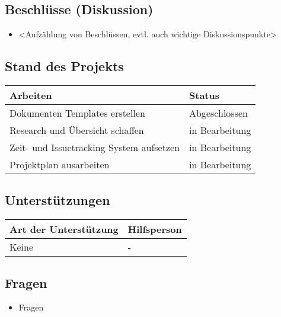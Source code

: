\vspace{1cm}

\subsection*{Beschlüsse (Diskussion)}
\begin{itemize}
    \item <Aufzählung von Beschlüssen, evtl. auch wichtige Diskussionspunkte>
\end{itemize}


\clearpage


\subsection*{Stand des Projekts}
\begin{table}[H]
    \centering
    \begin{tabular}{p{12cm} p{4cm}}
        \textbf{Arbeiten} & \textbf{Status} \\ \hline
        Dokumenten Templates erstellen & Abgeschlossen \\ \hline
        Research und Übersicht schaffen & in Bearbeitung \\ \hline
        Zeit- und Issuetracking System aufsetzen & in Bearbeitung \\ \hline
        Projektplan ausarbeiten & in Bearbeitung \\ \hline
    \end{tabular}
\end{table}

\vspace{1cm}

\subsection*{Unterstützungen}
\begin{table}[H]
    \centering
    \begin{tabular}{p{12cm} p{4cm}}
        \textbf{Art der Unterstützung} & \textbf{Hilfsperson} \\ \hline
        Keine & - \\ \hline
    \end{tabular}
\end{table}

\vspace{1cm}

\subsection*{Fragen}
\begin{itemize}
    \item Fragen
\end{itemize}

